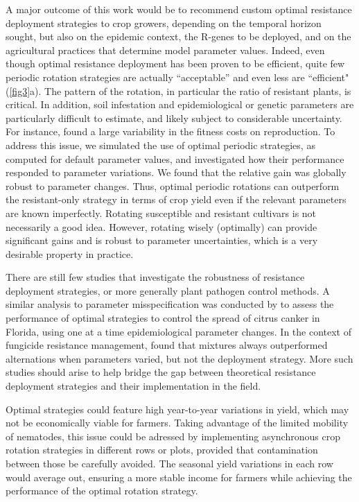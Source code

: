 {{{{A major outcome of this work would be to recommend custom optimal
resistance deployment strategies to crop growers, depending on the
temporal horizon sought, but also on the epidemic context, the R-genes
to be deployed, and on the agricultural practices that determine model
parameter values. Indeed, even though optimal resistance deployment
has been proven to be efficient, quite few periodic rotation
strategies are actually ``acceptable'' and even less are ``efficient"
(\autoref{fig3}a). The pattern of the rotation, in particular the
ratio of resistant plants, is critical. In addition, soil infestation
and epidemiological or genetic parameters are particularly difficult
to estimate, and likely subject to considerable uncertainty. For
instance, \citet{Djian-Caporalino2011} found a large variability in
the fitness costs on reproduction. To address this issue, we simulated
the use of optimal periodic strategies, as computed for default
parameter values, and investigated how their performance responded to
parameter variations. We found that the relative gain was globally
robust to parameter changes. Thus, optimal periodic rotations can
outperform the resistant-only strategy in terms of crop yield even if
the relevant parameters are known imperfectly. Rotating susceptible
and resistant cultivars is not necessarily a good idea. However,
rotating wisely (optimally) can provide significant gains and is
robust to parameter uncertainties, which is a very desirable property
in practice.

There are still few studies that investigate the
robustness of resistance deployment strategies, or more generally
plant pathogen control methods. A similar analysis to parameter
misspecification was conducted by \citet{Hyatt-Twynam2017} to assess
the performance of optimal strategies to control the spread of citrus
canker in Florida, using one at a time epidemiological parameter
changes. In the context of fungicide resistance management,
\citet{Elderfield2018} found that mixtures always outperformed
alternations when parameters varied, but not the deployment
strategy. More such studies should arise to help bridge the gap
between theoretical resistance deployment strategies and their
implementation in the field.

Optimal strategies could feature high year-to-year variations in
yield, which may not be economically viable for farmers. Taking
advantage of the limited mobility of nematodes, this issue could be
adressed by implementing asynchronous crop rotation strategies in
different rows or plots, provided that contamination between those be
carefully avoided. The seasonal yield variations in each row would
average out, ensuring a more stable income for farmers while achieving
the performance of the optimal rotation strategy.

}}}}

